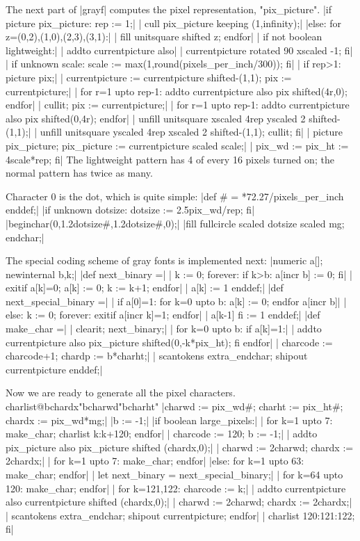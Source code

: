 The next part of |grayf| computes the pixel representation, "pix\_picture".
\beginlines
|if picture pix_picture: rep := 1;|
| cull pix_picture keeping (1,infinity);|
|else: for z=(0,2),(1,0),(2,3),(3,1):|
|  fill unitsquare shifted z; endfor|
| if not boolean lightweight:|
|  addto currentpicture also|
|  currentpicture rotated 90 xscaled -1; fi|
| if unknown scale: scale := max(1,round(pixels_per_inch/300)); fi|
\goodbreak
| if rep>1: picture pix;|
|  currentpicture := currentpicture shifted-(1,1); pix := currentpicture;|
|  for r=1 upto rep-1: addto currentpicture also pix shifted(4r,0); endfor|
|  cullit; pix := currentpicture;|
|  for r=1 upto rep-1: addto currentpicture also pix shifted(0,4r); endfor|
|  unfill unitsquare xscaled 4rep yscaled 2 shifted-(1,1);|
|  unfill unitsquare yscaled 4rep xscaled 2 shifted-(1,1); cullit; fi|
| picture pix_picture; pix_picture := currentpicture scaled scale;|
| pix_wd := pix_ht := 4scale*rep; fi|
\weakendlines
The lightweight pattern has 4 of every 16 pixels turned on; the normal
pattern has twice as many.

Character 0 is the dot, which is quite simple:
\beginlines
|def # = *72.27/pixels_per_inch enddef;|
|if unknown dotsize: dotsize := 2.5pix_wd/rep; fi|
\smallskip
|beginchar(0,1.2dotsize#,1.2dotsize#,0);|
|fill fullcircle scaled dotsize scaled mg; endchar;|
\endlines

The special coding scheme of gray fonts is implemented next:
\beginlines
|numeric a[]; newinternal b,k;|
|def next_binary =|
| k := 0; forever: if k>b: a[incr b] := 0; fi|
|  exitif a[k]=0; a[k] := 0; k := k+1; endfor|
| a[k] := 1 enddef;|
|def next_special_binary =|
| if a[0]=1: for k=0 upto b: a[k] := 0; endfor a[incr b]|
| else: k := 0; forever: exitif a[incr k]=1; endfor|
|  a[k-1] fi := 1 enddef;|
\smallbreak
|def make_char =|
| clearit; next_binary;|
| for k=0 upto b: if a[k]=1:|
|  addto currentpicture also pix_picture shifted(0,-k*pix_ht); fi endfor|
| charcode := charcode+1; chardp := b*charht;|
| scantokens extra_endchar; shipout currentpicture enddef;|
\endlines

Now we are ready to generate all the pixel characters.
^^@charlist@^^"chardx"^^"charwd"^^"charht"
\beginlines
|charwd := pix_wd#; charht := pix_ht#; chardx := pix_wd*mg;|
|b := -1;|
\smallskip
|if boolean large_pixels:|
| for k=1 upto 7: make_char; charlist k:k+120; endfor|
| charcode := 120; b := -1;|
| addto pix_picture also pix_picture shifted (chardx,0);|
| charwd := 2charwd; chardx := 2chardx;|
| for k=1 upto 7: make_char; endfor|
|else: for k=1 upto 63: make_char; endfor|
| let next_binary = next_special_binary;|
| for k=64 upto 120: make_char; endfor|
| for k=121,122: charcode := k;|
|  addto currentpicture also currentpicture shifted (chardx,0);|
|  charwd := 2charwd; chardx := 2chardx;|
|  scantokens extra_endchar; shipout currentpicture; endfor|
| charlist 120:121:122; fi|
\endlines

